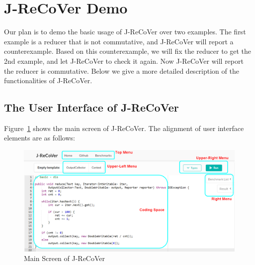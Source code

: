 % 
\clearpage
\appendix

\section{J-ReCoVer Demo}

Our plan is to demo the basic usage of J-ReCoVer over two examples. The first example is a reducer that is not commutative, and J-ReCoVer will report a counterexample. Based on this counterexample, we will fix the reducer to get the 2nd example, and let J-ReCoVer to check it again. Now J-ReCoVer will report the reducer is commutative. Below we give a more detailed description of the functionalities of J-ReCoVer. 

\subsection{The User Interface of J-ReCoVer}
\label{appendix:1}

Figure~\ref{fig:main_screen} shows the main screen of J-ReCoVer. The alignment of user interface elements are as follows:

\begin{figure}
\begin{center}
\includegraphics[width=.9\linewidth]{screenshots/main_screen_marked}
\caption{Main Screen of J-ReCoVer}
\label{fig:main_screen}
\end{center}
\end{figure}

